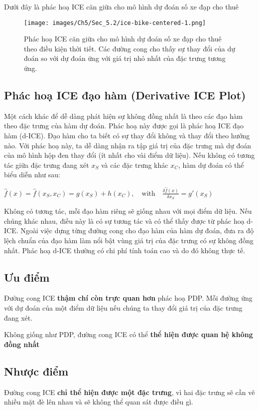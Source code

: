 Dưới đây là phác hoạ ICE căn giữa cho mô hình dự đoán số xe đạp cho thuê
\begin{figure*}[h!]
	\centering
	\texttt{[image: images/Ch5/Sec\_5.2/ice-bike-centered-1.png]}
	\label{fig:5_9}
	\caption{Phác hoạ ICE căn giữa cho mô hình dự đoán số xe đạp cho thuê theo điều kiện thời tiết. Các đường cong cho thấy sự thay đổi của dự đoán so với dự đoán ứng với giá trị nhỏ nhất của đặc trưng tương ứng.}
\end{figure*}
\subsection{Phác hoạ ICE đạo hàm (Derivative ICE Plot)}
Một cách khác để dễ dàng phát hiện sự không đồng nhất là theo các đạo hàm theo đặc trưng của hàm dự đoán. Phác hoạ này được gọi là phác hoạ ICE đạo hàm (d-ICE). Đạo hàm cho ta biết có sự thay đổi không và thay đổi theo hướng nào. Với phác hoạ này, ta dễ dàng nhận ra tập giá trị của đặc trưng mà dự đoán của mô hình hộp đen thay đổi (ít nhất cho vài điểm dữ liệu). Nếu không có tương tác giữa đặc trưng đang xét $x_S$ và các đặc trưng khác $x_C$, hàm dự đoán có thể biểu diễn như sau:
\begin{center}
    $\hat{f}(x)=\hat{f}(x_S,x_C)=g(x_S)+h(x_C),\quad\text{with}\quad\frac{\delta\hat{f}(x)}{\delta{}x_S}=g'(x_S)$
\end{center}
Không có tương tác, mỗi đạo hàm riêng sẽ giống nhau với mọi điểm dữ liệu. Nếu chúng khác nhau, điều này là có sự tương tác và có thể thấy được từ phác hoạ d-ICE. Ngoài việc dựng từng đường cong cho đạo hàm của hàm dự đoán, đưa ra độ lệch chuẩn của đạo hàm làm nổi bật vùng giá trị của đặc trưng có sự không đồng nhất. Phác hoạ d-ICE thường có chi phí tính toán cao và do đó không thực tế.

\subsection{Ưu điểm}
Đường cong ICE \textbf{thậm chí còn trực quan hơn} phác hoạ PDP. Mỗi đường ứng với dự đoán của một điểm dữ liệu nếu chúng ta thay đổi giá trị của đặc trưng đang xét.

Không giống như PDP, đường cong ICE có thể \textbf{thể hiện được quan hệ không đồng nhất}

\subsection{Nhược điểm}
Đường cong ICE \textbf{chỉ thể hiện được một đặc trưng}, vì hai đặc trưng sẽ cần vẽ nhiều mặt đè lên nhau và sẽ không thể quan sát được điều gì.

